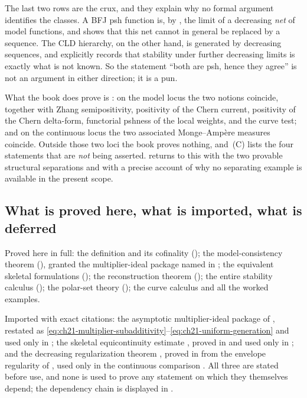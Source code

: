 The last two rows are the crux, and they explain why no formal argument
identifies the classes.  A BFJ psh function is, by
, the limit of a decreasing
\emph{net} of model functions, and  shows
that this net cannot in general be replaced by a sequence.  The CLD
hierarchy, on the other hand, is generated by decreasing sequences, and
 explicitly records that stability
under further decreasing limits is exactly what is not known.  So the
statement ``both are psh, hence they agree'' is not an argument in either
direction; it is a pun.

What the book does prove is
: on the model locus the two notions
coincide, together with Zhang semipositivity, positivity of the Chern
current, positivity of the Chern delta-form, functorial pshness of the local
weights, and the curve test; and on the continuous locus the two associated
Monge--Amp\`ere measures coincide.  Outside those two loci the book proves
nothing, and \,(C) lists the four
statements that are \emph{not} being asserted.  
returns to this with the two provable structural separations and with a
precise account of why no separating example is available in the present
scope.

\subsection{What is proved here, what is imported, what is deferred}
\label{sec:ch21-imported}

Proved here in full: the definition and its cofinality
(); the model-consistency theorem
(), granted the multiplier-ideal package
named in ; the equivalent skeletal
formulations (); the reconstruction theorem
(); the entire stability calculus
(); the polar-set theory
(); the curve calculus and all the worked
examples.

Imported with exact citations: the asymptotic multiplier-ideal package of
\cite[Appendix~B]{BFJ16}, restated as
\eqref{eq:ch21-multiplier-subadditivity}--\eqref{eq:ch21-uniform-generation}
and used only in ; the skeletal
equicontinuity estimate , proved in
 and used only in
; and the decreasing regularization
theorem , proved in
 from the envelope regularity of
, used only in the continuous comparison
.  All three are stated before use, and none
is used to prove any statement on which they themselves depend; the
dependency chain is displayed in .

